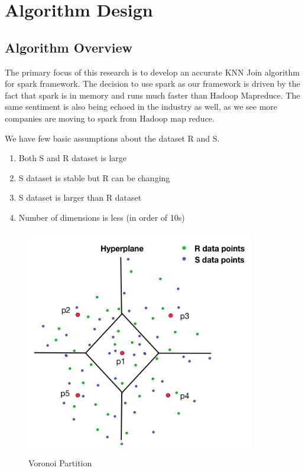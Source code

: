 \chapter{Algorithm Design} \label{chap:Algorithm Design}

\section{Algorithm Overview}
The primary focus of this research is to develop an accurate KNN
Join algorithm for spark framework. The decision to use spark as our
framework is driven by
the fact that spark is in memory and runs much faster than Hadoop
Mapreduce. The same sentiment is also being echoed in the industry as
well, as we see more companies are moving to spark from Hadoop map
reduce.

We have few basic assumptions about the dataset R and S.
\begin{enumerate}
\item Both S and R dataset is large
\item S dataset is stable but R can be changing
\item S dataset is larger than R dataset
\item Number of dimensions is less (in order of 10s)
\end{enumerate}


\begin{figure}[t!]
  \caption{Voronoi Partition}
  \label{voronoi_partition}
  \centering
\includegraphics[width=10cm,height=10cm]{images/voronoi.png}
\end{figure}


